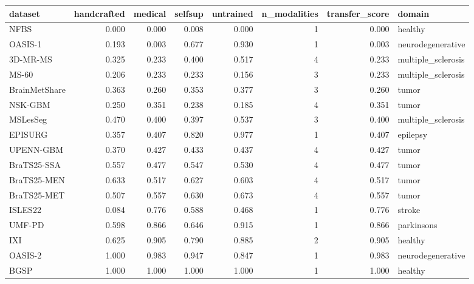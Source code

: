 \begin{tabular}{lrrrrrrl}
\toprule
dataset & handcrafted & medical & selfsup & untrained & n\_modalities & transfer\_score & domain \\
\midrule
NFBS & 0.000 & 0.000 & 0.008 & 0.000 & 1 & 0.000 & healthy \\
OASIS-1 & 0.193 & 0.003 & 0.677 & 0.930 & 1 & 0.003 & neurodegenerative \\
3D-MR-MS & 0.325 & 0.233 & 0.400 & 0.517 & 4 & 0.233 & multiple\_sclerosis \\
MS-60 & 0.206 & 0.233 & 0.233 & 0.156 & 3 & 0.233 & multiple\_sclerosis \\
BrainMetShare & 0.363 & 0.260 & 0.353 & 0.377 & 3 & 0.260 & tumor \\
NSK-GBM & 0.250 & 0.351 & 0.238 & 0.185 & 4 & 0.351 & tumor \\
MSLesSeg & 0.470 & 0.400 & 0.397 & 0.537 & 3 & 0.400 & multiple\_sclerosis \\
EPISURG & 0.357 & 0.407 & 0.820 & 0.977 & 1 & 0.407 & epilepsy \\
UPENN-GBM & 0.370 & 0.427 & 0.433 & 0.437 & 4 & 0.427 & tumor \\
BraTS25-SSA & 0.557 & 0.477 & 0.547 & 0.530 & 4 & 0.477 & tumor \\
BraTS25-MEN & 0.633 & 0.517 & 0.627 & 0.603 & 4 & 0.517 & tumor \\
BraTS25-MET & 0.507 & 0.557 & 0.630 & 0.673 & 4 & 0.557 & tumor \\
ISLES22 & 0.084 & 0.776 & 0.588 & 0.468 & 1 & 0.776 & stroke \\
UMF-PD & 0.598 & 0.866 & 0.646 & 0.915 & 1 & 0.866 & parkinsons \\
IXI & 0.625 & 0.905 & 0.790 & 0.885 & 2 & 0.905 & healthy \\
OASIS-2 & 1.000 & 0.983 & 0.947 & 0.847 & 1 & 0.983 & neurodegenerative \\
BGSP & 1.000 & 1.000 & 1.000 & 1.000 & 1 & 1.000 & healthy \\
\bottomrule
\end{tabular}
